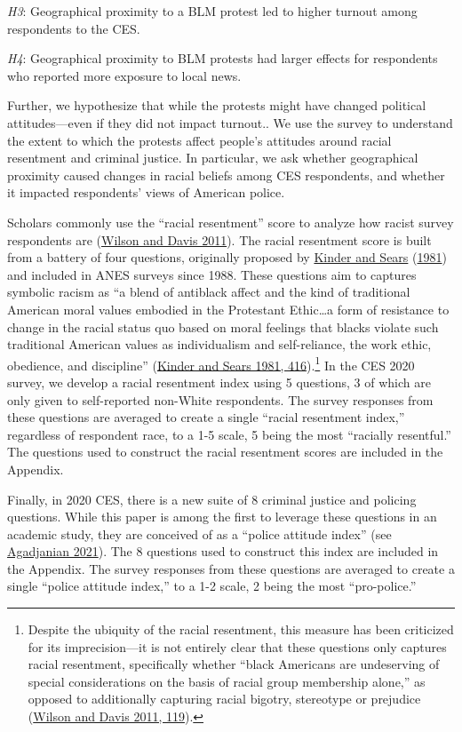 \documentclass[
  12pt,
]{article}
\begin{document}
\emph{H3}: Geographical proximity to a BLM protest led to higher turnout among respondents to the CES.

\emph{H4}: Geographical proximity to BLM protests had larger effects for respondents who reported more exposure to local news.

Further, we hypothesize that while the protests might have changed political attitudes---even if they did not impact turnout.. We use the survey to understand the extent to which the protests affect people's attitudes around racial resentment and criminal justice. In particular, we ask whether geographical proximity caused changes in racial beliefs among CES respondents, and whether it impacted respondents' views of American police.

Scholars commonly use the ``racial resentment'' score to analyze how racist survey respondents are (\protect\hyperlink{ref-Wilson2011}{Wilson and Davis 2011}). The racial resentment score is built from a battery of four questions, originally proposed by \protect\hyperlink{ref-Kinder1981}{Kinder and Sears} (\protect\hyperlink{ref-Kinder1981}{1981}) and included in ANES surveys since 1988. These questions aim to captures symbolic racism as ``a blend of antiblack affect and the kind of traditional American moral values embodied in the Protestant Ethic\ldots a form of resistance to change in the racial status quo based on moral feelings that blacks violate such traditional American values as individualism and self-reliance, the work ethic, obedience, and discipline'' (\protect\hyperlink{ref-Kinder1981}{Kinder and Sears 1981, 416}).\footnote{Despite the ubiquity of the racial resentment, this measure has been criticized for its imprecision---it is not entirely clear that these questions only captures racial resentment, specifically whether ``black Americans are undeserving of special considerations on the basis of racial group membership alone,'' as opposed to additionally capturing racial bigotry, stereotype or prejudice (\protect\hyperlink{ref-Wilson2011}{Wilson and Davis 2011, 119}).} In the CES 2020 survey, we develop a racial resentment index using 5 questions, 3 of which are only given to self-reported non-White respondents. The survey responses from these questions are averaged to create a single ``racial resentment index,'' regardless of respondent race, to a 1-5 scale, 5 being the most ``racially resentful.'' The questions used to construct the racial resentment scores are included in the Appendix.

Finally, in 2020 CES, there is a new suite of 8 criminal justice and policing questions. While this paper is among the first to leverage these questions in an academic study, they are conceived of as a ``police attitude index'' (see \protect\hyperlink{ref-Agadjanian2021}{Agadjanian 2021}). The 8 questions used to construct this index are included in the Appendix. The survey responses from these questions are averaged to create a single ``police attitude index,'' to a 1-2 scale, 2 being the most ``pro-police.''
\end{document}
